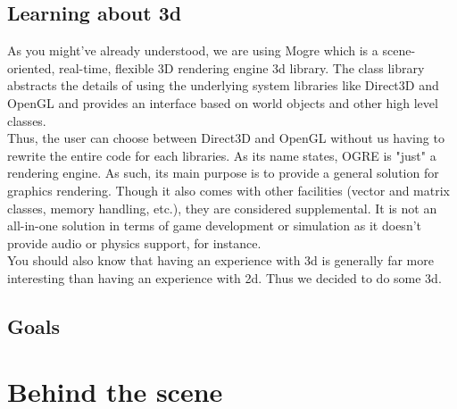 \documentclass[article]{report} %
\begin{document}
						\section{Learning about 3d}
								As you might've already understood, we are using Mogre which is a scene-oriented, real-time, flexible 3D rendering engine 3d library.\newline
								The class library abstracts the details of using the underlying system libraries like Direct3D and OpenGL and provides an interface based on world objects and other high level classes.\\
								
								Thus, the user can choose between Direct3D and OpenGL without us having to rewrite the entire code for each libraries. As its name states, OGRE is "just" a rendering engine. As such, its main purpose is to provide a general solution for graphics rendering. Though it also comes with other facilities (vector and matrix classes, memory handling, etc.), they are considered supplemental. It is not an all-in-one solution in terms of game development or simulation as it doesn't provide audio or physics support, for instance.\\
								
								You should also know that having an experience with 3d is generally far more interesting than having an experience with 2d. Thus we decided to do some 3d.
								
								
					
						\section{Goals}
				\chapter{Behind the scene}
\end{document}
